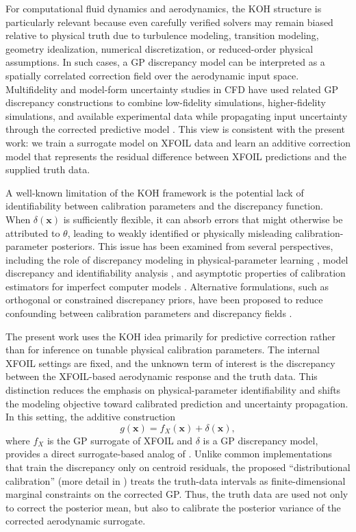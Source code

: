 \documentclass[journal]{new-aiaa}
\newcommand{\x}{\mathbf{x}}
\begin{document}
For computational fluid dynamics and aerodynamics, the KOH structure is particularly relevant because even carefully verified solvers may remain biased relative to physical truth due to turbulence modeling, transition modeling, geometry idealization, numerical discretization, or reduced-order physical assumptions. In such cases, a GP discrepancy model can be interpreted as a spatially correlated correction field over the aerodynamic input space. Multifidelity and model-form uncertainty studies in CFD have used related GP discrepancy constructions to combine low-fidelity simulations, higher-fidelity simulations, and available experimental data while propagating input uncertainty through the corrected predictive model \cite{wang2017propagation}. This view is consistent with the present work: we train a surrogate model on XFOIL data and learn an additive correction model that represents the residual difference between XFOIL predictions and the supplied truth data.

A well-known limitation of the KOH framework is the potential lack of identifiability between calibration parameters and the discrepancy function. When $\delta(\x)$ is sufficiently flexible, it can absorb errors that might otherwise be attributed to $\theta$, leading to weakly identified or physically misleading calibration-parameter posteriors. This issue has been examined from several perspectives, including the role of discrepancy modeling in physical-parameter learning \cite{brynjarsdottir2014learning}, model discrepancy and identifiability analysis \cite{arendt2012quantification}, and asymptotic properties of calibration estimators for imperfect computer models \cite{tuo2015efficient,tuo2016theoretical}. Alternative formulations, such as orthogonal or constrained discrepancy priors, have been proposed to reduce confounding between calibration parameters and discrepancy fields \cite{plumlee2017bayesian}.

The present work uses the KOH idea primarily for predictive correction rather than for inference on tunable physical calibration parameters. The internal XFOIL settings are fixed, and the unknown term of interest is the discrepancy between the XFOIL-based aerodynamic response and the truth data. This distinction reduces the emphasis on physical-parameter identifiability and shifts the modeling objective toward calibrated prediction and uncertainty propagation. In this setting, the additive construction
\begin{equation}
    g(\x) = f_X(\x) + \delta(\x),
    \label{eq:composite_gp_review}
\end{equation}
where $f_X$ is the GP surrogate of XFOIL and $\delta$ is a GP discrepancy model, provides a direct surrogate-based analog of . Unlike common implementations that train the discrepancy only on centroid residuals, the proposed ``distributional calibration'' (more detail in ) treats the truth-data intervals as finite-dimensional marginal constraints on the corrected GP. Thus, the truth data are used not only to correct the posterior mean, but also to calibrate the posterior variance of the corrected aerodynamic surrogate.
\end{document}

